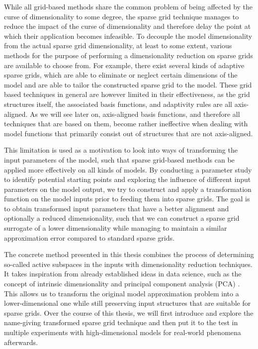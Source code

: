 \documentclass[
  a4paper,  %
  twoside,  %
  bibliography=totoc,
  headsepline,
  cleardoublepage=empty,
  parskip=half,
  draft=false
]{scrbook}
\begin{document}
While all grid-based methods share the common problem of being affected by the curse of dimensionality to some degree, the sparse grid technique \cite{Zenger1991} manages to reduce the impact of the curse of dimensionality and therefore delay the point at which their application becomes infeasible.
To decouple the model dimensionality from the actual sparse grid dimensionality, at least to some extent, various methods for the purpose of performing a dimensionality reduction on sparse grids are available to choose from.
For example, there exist several kinds of adaptive sparse grids, which are able to eliminate or neglect certain dimensions of the model and are able to tailor the constructed sparse grid to the model.
These grid based techniques in general are however limited in their effectiveness, as the grid structures itself, the associated basis functions, and adaptivity rules are all axis-aligned.
As we will see later on, axis-aligned basis functions, and therefore all techniques that are based on them, become rather ineffective when dealing with model functions that primarily consist out of structures that are not axis-aligned.

This limitation is used as a motivation to look into ways of transforming the input parameters of the model, such that sparse grid-based methods can be applied more effectively on all kinds of models.
By conducting a parameter study to identify potential starting points and exploring the influence of different input parameters on the model output, we try to construct and apply a transformation function on the model inputs prior to feeding them into sparse grids.
The goal is to obtain transformed input parameters that have a better alignment and optionally a reduced dimensionality, such that we can construct a sparse grid surrogate of a lower dimensionality while managing to maintain a similar approximation error compared to standard sparse grids.

The concrete method presented in this thesis combines the process of determining so-called active subspaces in the inputs \cite{Constantine2015} with dimensionality reduction techniques.
It takes inspiration from already established ideas in data science, such as the concept of intrinsic dimensionality \cite{Bennett1969} and principal component analysis (PCA) \cite{Abdi2010}.
This allows us to transform the original model approximation problem into a lower-dimensional one while still preserving input structures that are suitable for sparse grids.
Over the course of this thesis, we will first introduce and explore the name-giving transformed sparse grid technique and then put it to the test in multiple experiments with high-dimensional models for real-world phenomena afterwards.
\end{document}
